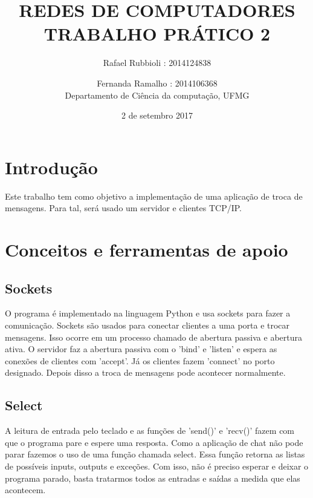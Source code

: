 \documentclass[10pt]{article}
\title{\LARGE \textbf{\uppercase{REDES DE COMPUTADORES\\Trabalho prático 2}} }
\date{2 de setembro 2017}
\author{Rafael Rubbioli : 2014124838\\
\and Fernanda Ramalho : 2014106368 \\ Departamento de Ciência da computação, UFMG}
\begin{document}
	\maketitle 
	\section{Introdução}
	Este trabalho tem como objetivo a implementação de uma aplicação de troca de mensagens. Para tal, será usado um servidor e clientes TCP/IP.
	\section{Conceitos e ferramentas de apoio}
	\subsection{Sockets}	
	O programa é implementado na linguagem Python e usa sockets para fazer a comunicação. Sockets são usados para conectar clientes a uma porta e trocar mensagens. Isso ocorre em um processo chamado de abertura passiva e abertura ativa. O servidor faz a abertura passiva com o 'bind' e 'listen' e espera as conexões de clientes com 'accept'. Já os clientes fazem 'connect' no porto designado. Depois disso a troca de mensagens pode acontecer normalmente.
	\subsection{Select}
	A leitura de entrada pelo teclado e as funções de 'send()' e 'recv()' fazem com que o programa pare e espere uma resposta. Como a aplicação de chat não pode parar fazemos o uso de uma função chamada select. Essa função retorna as listas de possíveis inputs, outputs e exceções. Com isso, não é preciso esperar e deixar o programa parado, basta tratarmos todos as entradas e saídas a medida que elas acontecem.
\end{document}
